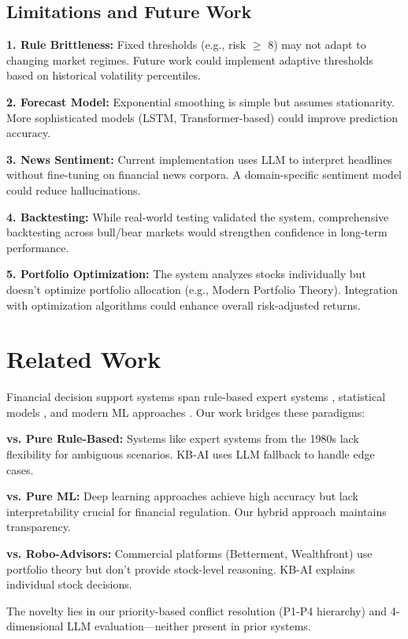 \documentclass[11pt,letterpaper]{article}
\begin{document}
\subsection{Limitations and Future Work}

\textbf{1. Rule Brittleness:} Fixed thresholds (e.g., risk $\geq$ 8) may not adapt to changing market regimes. Future work could implement adaptive thresholds based on historical volatility percentiles.

\textbf{2. Forecast Model:} Exponential smoothing is simple but assumes stationarity. More sophisticated models (LSTM, Transformer-based) could improve prediction accuracy.

\textbf{3. News Sentiment:} Current implementation uses LLM to interpret headlines without fine-tuning on financial news corpora. A domain-specific sentiment model could reduce hallucinations.

\textbf{4. Backtesting:} While real-world testing validated the system, comprehensive backtesting across bull/bear markets would strengthen confidence in long-term performance.

\textbf{5. Portfolio Optimization:} The system analyzes stocks individually but doesn't optimize portfolio allocation (e.g., Modern Portfolio Theory). Integration with optimization algorithms could enhance overall risk-adjusted returns.

\section{Related Work}

Financial decision support systems span rule-based expert systems \cite{brown1990expert}, statistical models \cite{box2015time}, and modern ML approaches \cite{jiang2021applications}. Our work bridges these paradigms:

\textbf{vs. Pure Rule-Based:} Systems like expert systems from the 1980s lack flexibility for ambiguous scenarios. KB-AI uses LLM fallback to handle edge cases.

\textbf{vs. Pure ML:} Deep learning approaches \cite{fischer2018deep} achieve high accuracy but lack interpretability crucial for financial regulation. Our hybrid approach maintains transparency.

\textbf{vs. Robo-Advisors:} Commercial platforms (Betterment, Wealthfront) use portfolio theory but don't provide stock-level reasoning. KB-AI explains individual stock decisions.

The novelty lies in our priority-based conflict resolution (P1-P4 hierarchy) and 4-dimensional LLM evaluation—neither present in prior systems.
\end{document}
